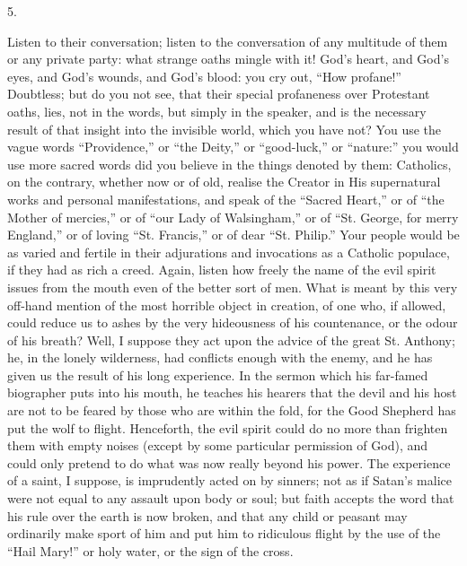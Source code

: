 5.

Listen to their conversation; listen to the conversation of any
multitude of them or any private party: what strange oaths mingle with
it! God's heart, and God's eyes, and God's wounds, and God's blood:
you cry out, ``How profane!'' Doubtless; but do you not see,
that their special profaneness over Protestant oaths, lies, not in the
words, but simply in the speaker, and is the necessary result of that
insight into the invisible world, which you have not? You use the
vague words ``Providence,'' or ``the Deity,'' or
``good-luck,'' or ``nature:'' you would use more
sacred words did you believe in the things denoted by them: Catholics,
on the contrary, whether now or of old, realise the Creator in His
supernatural works and personal manifestations, and speak of the
``Sacred Heart,'' or of ``the Mother of mercies,'' or
of ``our Lady of Walsingham,'' or of ``St. George, for
merry England,'' or of loving ``St. Francis,'' or of dear
``St. Philip.'' Your people would be as varied and fertile in
their adjurations and invocations as a Catholic populace, if they had
as rich a creed. Again, listen how freely the name of the evil spirit
issues from the mouth even of the better sort of men. What is meant by
this very off-hand mention of the most horrible object in creation, of
one who, if allowed, could reduce us to ashes by the very hideousness
of his countenance, or the odour of his breath? Well, I suppose they
act upon the advice of the great St. Anthony; he, in the lonely
wilderness, had conflicts enough with the enemy, and he has given us
the result of his long experience. In the sermon which his far-famed
biographer puts into his mouth, he teaches his hearers that the devil
and his host are not to be feared by those who are within the fold,
for the Good Shepherd has put the wolf to flight. Henceforth, the evil
spirit could do no more than frighten them with empty noises (except
by some particular permission of God), and could only pretend to do
what was now really beyond his power. The experience of a saint, I
suppose, is imprudently acted on by sinners; not as if Satan's malice
were not equal to any assault upon body or soul; but faith accepts the
word that his rule over the earth is now broken, and that any child or
peasant may ordinarily make sport of him and put him to ridiculous
flight by the use of the ``Hail Mary!'' or holy water, or the
sign of the cross.

